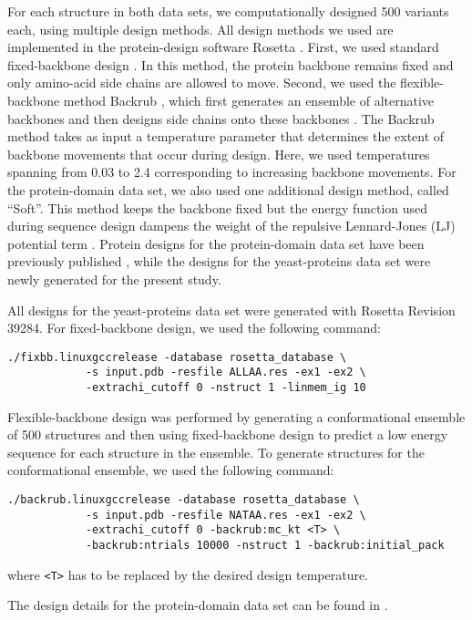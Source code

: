 \documentclass[12pt]{article}
\begin{document}
For each structure in both data sets, we computationally designed 500 variants each, using multiple design methods. All design methods we used are implemented in the protein-design software Rosetta \citep{LeaverFayetal2011}. First, we used standard fixed-backbone design \citep{Kuhlman2003}. In this method, the protein backbone remains fixed and only amino-acid side chains are allowed to move. Second, we used the flexible-backbone method Backrub \citep{Smith2008}, which first generates an ensemble of alternative backbones and then designs side chains onto these backbones \citep{Friedland2009, Smith2010}. The Backrub method takes as input a temperature parameter that determines the extent of backbone movements that occur during design. Here, we used temperatures spanning from 0.03 to 2.4 corresponding to increasing backbone movements. For the protein-domain data set, we also used one additional design method, called ``Soft''. This method keeps the backbone fixed but the energy function used during sequence design dampens the weight of the repulsive Lennard-Jones (LJ) potential term \citep{OllikainenKortemme}.  Protein designs for the protein-domain data set have been previously published \citep{OllikainenKortemme}, while the designs for the yeast-proteins data set were newly generated for the present study.

All designs for the yeast-proteins data set were generated with Rosetta Revision 39284. For fixed-backbone design, we used the following command:
\begin{verbatim}
./fixbb.linuxgccrelease -database rosetta_database \
            -s input.pdb -resfile ALLAA.res -ex1 -ex2 \
            -extrachi_cutoff 0 -nstruct 1 -linmem_ig 10
\end{verbatim}

\noindent Flexible-backbone design was performed by generating a conformational ensemble of 500 structures and then using fixed-backbone design to predict a low energy sequence for each structure in the ensemble. To generate structures for the conformational ensemble, we used the following command:
\begin{verbatim}
./backrub.linuxgccrelease -database rosetta_database \
            -s input.pdb -resfile NATAA.res -ex1 -ex2 \
            -extrachi_cutoff 0 -backrub:mc_kt <T> \
            -backrub:ntrials 10000 -nstruct 1 -backrub:initial_pack
\end{verbatim}
\noindent where \texttt{<T>} has to be replaced by the desired design temperature.

The design details for the protein-domain data set can be found in \citet{OllikainenKortemme}.
\end{document}
